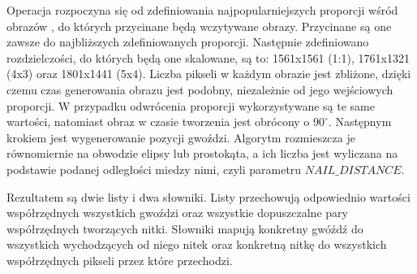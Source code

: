     Operacja rozpoczyna się od zdefiniowania najpopularniejszych proporcji wśród obrazów \cite{aspect-ratio-youtube}, do których przycinane będą wczytywane obrazy. Przycinane są one zawsze do najbliższych zdefiniowanych proporcji. Następnie zdefiniowano rozdzielczości, do których będą one skalowane, są to: 1561x1561 (1:1), 1761x1321 (4x3) oraz 1801x1441 (5x4). Liczba pikseli w każdym obrazie jest zbliżone, dzięki czemu czas generowania obrazu jest podobny, niezależnie od jego wejściowych proporcji. W przypadku odwrócenia proporcji wykorzystywane są te same wartości, natomiast obraz w czasie tworzenia jest obrócony o $90^\circ$. Następnym krokiem jest wygenerowanie pozycji gwoździ. Algorytm rozmieszcza je równomiernie na obwodzie elipsy lub prostokąta, a ich liczba jest wyliczana na podstawie podanej odległości miedzy nimi, czyli parametru \(NAIL\_DISTANCE\).
    
    Rezultatem są dwie listy i dwa słowniki. Listy przechowują odpowiednio wartości współrzędnych wszystkich gwoździ oraz wszystkie dopuszczalne pary współrzędnych tworzących nitki. Słowniki mapują konkretny gwóźdź do wszystkich wychodzących od niego nitek oraz konkretną nitkę do wszystkich współrzędnych pikseli przez które przechodzi. 
    
